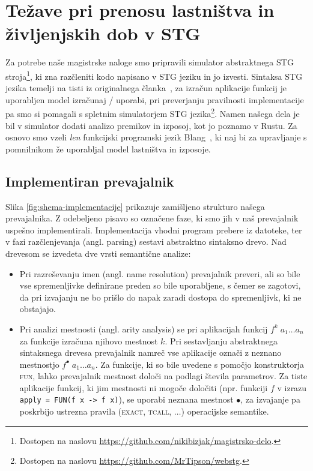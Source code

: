 \chapter[Lastništvo in izposoja v STG]{Težave pri prenosu lastništva in življenjskih dob v STG}
\label{ch:problemi}

Za potrebe naše magistrske naloge smo pripravili simulator abstraktnega STG stroja\footnote{Dostopen na naslovu \url{https://github.com/nikibizjak/magistrsko-delo}.}, ki zna razčleniti kodo napisano v STG jeziku in jo izvesti. Sintaksa STG jezika temelji na tisti iz originalnega članka~\cite{marlow2004making}, za izračun aplikacije funkcij je uporabljen model izračunaj / uporabi, pri preverjanju pravilnosti implementacije pa smo si pomagali s spletnim simulatorjem STG jezika\footnote{Dostopen na naslovu \url{https://github.com/MrTipson/webstg}.}. Namen našega dela je bil v simulator dodati analizo premikov in izposoj, kot jo poznamo v Rustu. Za osnovo smo vzeli \emph{len} funkcijski programski jezik Blang~\cite{turk2022len}, ki naj bi za upravljanje s pomnilnikom že uporabljal model lastništva in izposoje.


\section{Implementiran prevajalnik}
Slika \ref{fig:shema-implementacije} prikazuje zamišljeno strukturo našega prevajalnika. Z odebeljeno pisavo so označene faze, ki smo jih v naš prevajalnik uspešno implementirali. Implementacija vhodni program prebere iz datoteke, ter v fazi razčlenjevanja (angl. parsing) sestavi abstraktno sintaksno drevo. Nad drevesom se izvedeta dve vrsti semantične analize:

\begin{itemize}
    \itemsep 0em
    \item Pri razreševanju imen (angl. name resolution) prevajalnik preveri, ali so bile vse spremenljivke definirane preden so bile uporabljene, s čemer se zagotovi, da pri izvajanju ne bo prišlo do napak zaradi dostopa do spremenljivk, ki ne obstajajo.
    \item Pri analizi mestnosti (angl. arity analysis) se pri aplikacijah funkcij $f^k \; a_1 \dots a_n$ za funkcije izračuna njihovo mestnost $k$. Pri sestavljanju abstraktnega sintaksnega drevesa prevajalnik namreč vse aplikacije označi z neznano mestnostjo $f^{\bullet} \; a_1 \dots a_n$. Za funkcije, ki so bile uvedene s pomočjo konstruktorja \textsc{fun}, lahko prevajalnik mestnost določi na podlagi števila parametrov. Za tiste aplikacije funkcij, ki jim mestnosti ni mogoče določiti (npr. funkciji $f$ v izrazu \texttt{apply = FUN(f x -> f x)}), se uporabi neznana mestnost $\bullet$, za izvajanje pa poskrbijo  ustrezna pravila (\textsc{exact}, \textsc{tcall}, $\dots$) operacijske semantike.
\end{itemize}

